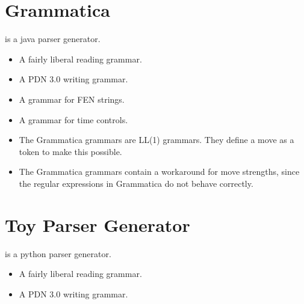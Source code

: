 \documentclass[letterpaper,10pt,english]{sphinxmanual}
\begin{document}
\section{Grammatica}
\label{\detokenize{implementation:grammatica}}
\sphinxAtStartPar
{} is a java parser generator.
\begin{itemize}
\item {} 
\sphinxAtStartPar
{} A fairly liberal reading grammar.

\item {} 
\sphinxAtStartPar
{} A PDN 3.0 writing grammar.

\item {} 
\sphinxAtStartPar
{} A grammar for FEN strings.

\item {} 
\sphinxAtStartPar
{} A grammar for time controls.

\end{itemize}
\begin{itemize}
\item {} 
\sphinxAtStartPar
The Grammatica grammars are LL(1) grammars. They define a move as a token to make this possible.

\item {} 
\sphinxAtStartPar
The Grammatica grammars contain a workaround for move strengths, since the regular expressions in Grammatica do not behave correctly.

\end{itemize}


\section{Toy Parser Generator}
\label{\detokenize{implementation:toy-parser-generator}}
\sphinxAtStartPar
{} is a python parser generator.
\begin{itemize}
\item {} 
\sphinxAtStartPar
{} A fairly liberal reading grammar.

\item {} 
\sphinxAtStartPar
{} A PDN 3.0 writing grammar.

\end{itemize}
\end{document}
